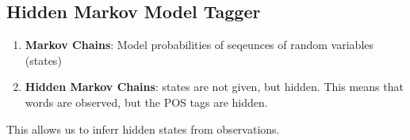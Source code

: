 \documentclass[11pt]{article}
\begin{document}
\subsection{Hidden Markov Model Tagger}

\begin{minipage}[l]{.5\linewidth}
    \begin{figure}[H]
        \centering
    \end{figure}    
\end{minipage}\hfill
\begin{minipage}[r]{.48\linewidth}
    \begin{enumerate}
        \item \textbf{Markov Chains}: Model probabilities of seqeunces of random variables (states)
        \item \textbf{Hidden Markov Chains}: states are not given, but hidden. This means that words are observed, but the POS tags are hidden.
    \end{enumerate}
    
    This allows us to inferr hidden states from observations.
\end{minipage}
\end{document}
